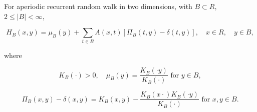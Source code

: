For aperiodic recurrent random walk in two dimensions, with $B \subset R$, $2 \leq |B| < \infty$,

$$H_B(x,y) = \mu_B(y) + \sum_{t \in B} A(x,t)[\Pi_B(t,y) - \delta(t,y)], \quad x \in R, \quad y \in B,$$

where

$$K_B(\cdot) > 0, \quad \mu_B(y) = \frac{K_B(\cdot y)}{K_B(\cdot)} \text{ for } y \in B,$$

$$\Pi_B(x,y) - \delta(x,y) = K_B(x,y) - \frac{K_B(x \cdot) K_B(\cdot y)}{K_B(\cdot)} \text{ for } x, y \in B.$$